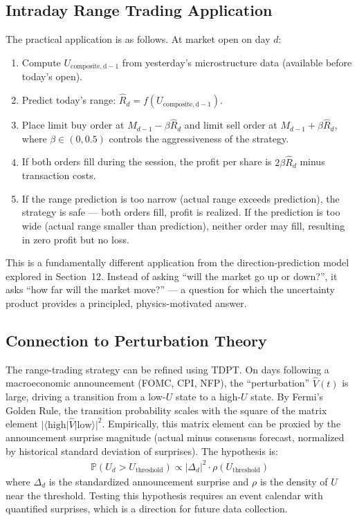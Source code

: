\documentclass[preprint,12pt]{elsarticle}
\begin{document}
\subsection{Intraday Range Trading Application}

The practical application is as follows. At market open on day $d$:

\begin{enumerate}
    \item Compute $U_\mathrm{composite,d-1}$ from yesterday's microstructure data (available before today's open).
    \item Predict today's range: $\hat{R}_d = f(U_\mathrm{composite,d-1})$.
    \item Place limit buy order at $M_{d-1} - \beta \hat{R}_d$ and limit sell order at $M_{d-1} + \beta \hat{R}_d$, where $\beta \in (0, 0.5)$ controls the aggressiveness of the strategy.
    \item If both orders fill during the session, the profit per share is $2\beta \hat{R}_d$ minus transaction costs.
    \item If the range prediction is too narrow (actual range exceeds prediction), the strategy is safe --- both orders fill, profit is realized. If the prediction is too wide (actual range smaller than prediction), neither order may fill, resulting in zero profit but no loss.
\end{enumerate}

This is a fundamentally different application from the direction-prediction model explored in Section~12. Instead of asking ``will the market go up or down?'', it asks ``how far will the market move?'' --- a question for which the uncertainty product provides a principled, physics-motivated answer.

\subsection{Connection to Perturbation Theory}

The range-trading strategy can be refined using TDPT. On days following a macroeconomic announcement (FOMC, CPI, NFP), the ``perturbation'' $\hat{V}(t)$ is large, driving a transition from a low-$U$ state to a high-$U$ state. By Fermi's Golden Rule, the transition probability scales with the square of the matrix element $|\langle \mathrm{high}|\hat{V}|\mathrm{low}\rangle|^2$. Empirically, this matrix element can be proxied by the announcement surprise magnitude (actual minus consensus forecast, normalized by historical standard deviation of surprises). The hypothesis is:
\begin{align}
    \mathbb{P}(U_{d} > U_\mathrm{threshold}) \propto |\Delta_d|^2 \cdot \rho(U_\mathrm{threshold})
\end{align}
where $\Delta_d$ is the standardized announcement surprise and $\rho$ is the density of $U$ near the threshold. Testing this hypothesis requires an event calendar with quantified surprises, which is a direction for future data collection.
\end{document}
